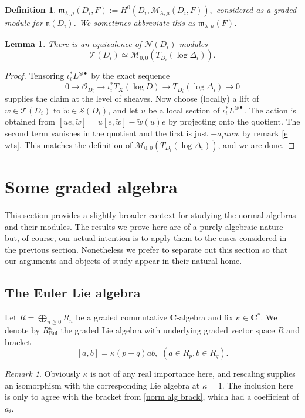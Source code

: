 \documentclass[12pt, oneside]{amsart}       %
\newtheorem{definition}[theorem]{Definition}
\newtheorem{lemma}[theorem]{Lemma}
\theoremstyle{remark}
\newtheorem*{remark}{Remark}
\renewcommand{\geq}{\geqslant}
\newcommand{\OO}{\mathcal{O}}
\begin{document}
\begin{definition} $\mathfrak{m}_{\lambda,\mu}(D_i,F):=H^0(D_i,\mathcal{M}_{\lambda,\mu}(D_i,F)),$ considered as a graded module for $\mathfrak{n}(D_i)$. We sometimes abbreviate this as $\mathfrak{m}_{\lambda,\mu}(F)$. \end{definition} \begin{lemma}\label{tgt term} There is an equivalence of $\mathcal{N}(D_i)$-modules $$\mathcal{T}(D_i)\simeq\mathcal{M}_{0,0}(T_{D_i}(\log\Delta_i)).$$ \end{lemma}\begin{proof} Tensoring $\iota_i^*L^{\otimes\bullet}$ by the exact sequence $$0\to\OO_{D_i}\to\iota_i^*T_X(\log D)\to T_{D_i}(\log\Delta_i)\to 0$$ supplies the claim at the level of sheaves. Now choose (locally) a lift of $w\in\mathcal{T}(D_i)$ to $\widetilde{w}\in\mathcal{S}(D_i)$, and let $u$ be a local section of $\iota_i^*L^{\otimes\bullet}$. The action is obtained from $[ue,\widetilde{w}]=u[e,\widetilde{w}]-\widetilde{w}(u)e$ by projecting onto the quotient. The second term vanishes in the quotient and the first is just $-a_inuw$ by remark \ref{e wts}. This matches the definition of $\mathcal{M}_{0,0}(T_{D_i}(\log\Delta_i))$, and we are done. \end{proof}

\section{Some graded algebra}\label{just algebra}

This section provides a slightly broader context for studying the normal algebras and their modules. The results we prove here are of a purely algebraic nature but, of course, our actual intention is to apply them to the cases considered in the previous section. Nonetheless we prefer to separate out this section so that our arguments and objects of study appear in their natural home.

\subsection{The Euler Lie algebra} Let $R=\bigoplus_{n\geq0}R_n$ be a graded commutative $\mathbf C$-algebra and fix $\kappa\in\mathbf C^*$. We denote by $R_{\mathrm{Eul}}^\kappa$ the graded Lie algebra with underlying graded vector space $R$ and bracket $$[a,b]=\kappa(p-q)ab,\,\, (a\in R_p,b\in R_q).$$ \begin{remark} Obviously $\kappa$ is not of any real importance here, and rescaling supplies an isomorphism with the corresponding Lie algebra at $\kappa=1$. The inclusion here is only to agree with the bracket from \ref{norm alg brack}, which had a coefficient of $a_i$. \end{remark}
\end{document}
